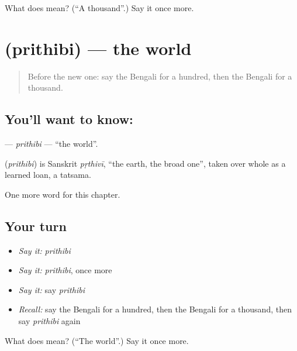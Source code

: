 \begin{tcolorbox}[breakable,colback=teal!4,colframe=teal!35!black,title={Before you move on}]
What does  mean? (\textquotedblleft{}A thousand\textquotedblright{}.) Say it once more.
\end{tcolorbox}
\section[\texorpdfstring{\bn{পৃথিবী} (prithibi)}{পৃথিবী (prithibi)}]{ (prithibi) — the world}

\label{lesson:BN-C88-prithibi}



\begin{quote}
Before the new one: say the Bengali for a hundred, then the Bengali for a thousand.
\end{quote}

\subsection*{You'll want to know: }
\textbf{} — \emph{prithibi} — \textquotedblleft{}the world\textquotedblright{}.

\begin{cousinweb}
\textbf{} (\emph{prithibi}) is Sanskrit \emph{pṛthivī}, \textquotedblleft{}the earth, the broad one\textquotedblright{}, taken over whole as a learned loan, a tatsama.
\end{cousinweb}

\begin{grammarlens}[title={What you've built}]
One more word for this chapter.
\end{grammarlens}

\subsection*{Your turn}
\begin{itemize}
\raggedright
  \item \emph{Say it:} \emph{prithibi}
  \item \emph{Say it:} \emph{prithibi}, once more
  \item \emph{Say it:} say \emph{prithibi}
  \item \emph{Recall:} say the Bengali for a hundred, then the Bengali for a thousand, then say \emph{prithibi} again
\end{itemize}

\begin{tcolorbox}[breakable,colback=teal!4,colframe=teal!35!black,title={Before you move on}]
What does  mean? (\textquotedblleft{}The world\textquotedblright{}.) Say it once more.
\end{tcolorbox}

